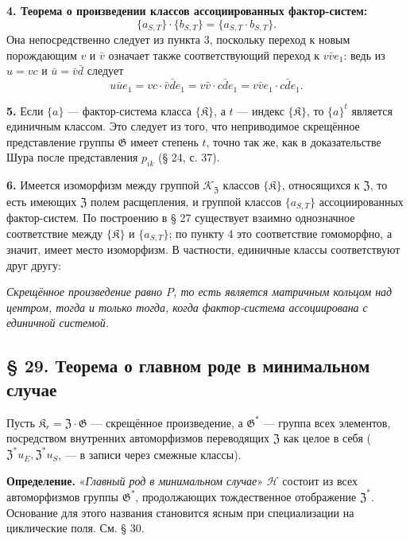 \documentclass[11pt]{article}
\begin{document}
\noindent\textbf{4. Теорема о произведении классов ассоциированных фактор-систем:}
\[
\{a_{S,T}\}\cdot\{b_{S,T}\}=\{a_{S,T}\cdot b_{S,T}\}.
\]
Она непосредственно следует из пункта 3, поскольку переход к новым порождающим \(v\) и \(\bar v\) означает также соответствующий переход к \(v\bar ve_1\): ведь из \(u=vc\) и \(\bar u=\bar v\bar d\) следует
\[
u\bar ue_1=vc\cdot\bar v\bar de_1=v\bar v\cdot c\bar de_1=v\bar ve_1\cdot c\bar de_1.
\]

\noindent\textbf{5.} Если \(\{a\}\) --- фактор-система класса \(\{\mathfrak K\}\), а \(t\) --- индекс \(\{\mathfrak K\}\), то \(\{a\}^t\) является единичным классом. Это следует из того, что неприводимое скрещённое представление группы \(\mathfrak G\) имеет степень \(t\), точно так же, как в доказательстве Шура после представления \(p_{ik}\) (§ 24, с. 37).

\noindent\textbf{6.} Имеется изоморфизм между группой \(\mathscr K_{\mathfrak Z}\) классов \(\{\mathfrak K\}\), относящихся к \(\mathfrak Z\), то есть имеющих \(\mathfrak Z\) полем расщепления, и группой классов \(\{a_{S,T}\}\) ассоциированных фактор-систем. По построению в § 27 существует взаимно однозначное соответствие между \(\{\mathfrak K\}\) и \(\{a_{S,T}\}\); по пункту 4 это соответствие гомоморфно, а значит, имеет место изоморфизм. В частности, единичные классы соответствуют друг другу:

\noindent\emph{Скрещённое произведение равно \(P\), то есть является матричным кольцом над центром, тогда и только тогда, когда фактор-система ассоциирована с единичной системой.}

\subsection*{§ 29. Теорема о главном роде в минимальном случае}\label{hauptgeschlechtssatz-im-minimalen}

Пусть \(\mathfrak K_r=\mathfrak Z\cdot\mathfrak G\) --- скрещённое произведение, а \(\mathfrak G^*\) --- группа всех элементов, посредством внутренних автоморфизмов переводящих \(\mathfrak Z\) как целое в себя (\(\mathfrak Z^*u_E,\mathfrak Z^*u_S\), --- в записи через смежные классы).

\noindent\textbf{Определение.} «\emph{Главный род в минимальном случае}» \(\mathscr H\) состоит из всех автоморфизмов группы \(\mathfrak G^*\), продолжающих тождественное отображение \(\mathfrak Z^*\). Основание для этого названия становится ясным при специализации на циклические поля. См. § 30.
\end{document}
